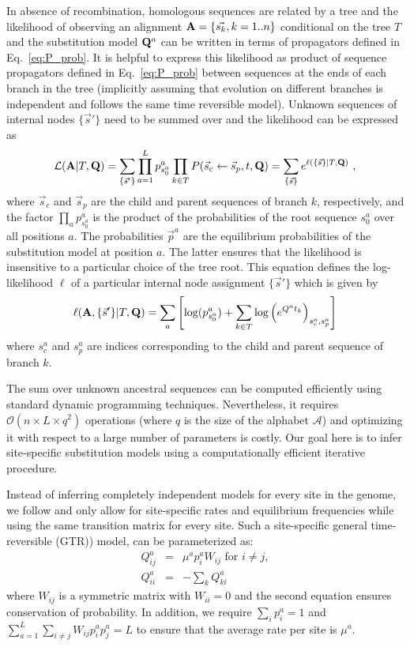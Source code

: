 \documentclass[aps,rmp,twocolumn,linenumbers]{revtex4-1}
\newcommand{\mat}[1]{{\bf #1}}
\newcommand{\abet}{\mathcal{A}}
\newcommand{\eqp}{p}
\newcommand{\LH}{\mathcal{L}}
\newcommand{\lh}{\ell}
\begin{document}
In absence of recombination, homologous sequences are related by a tree and the likelihood of observing an alignment $\mat{A}=\{\vec{s_k}, k=1..n\}$ conditional on the tree $T$ and the substitution model $\mat{Q}^{a}$ can be written in terms of propagators defined in Eq.~\ref{eq:P_prob}.
It is helpful to express this likelihood as product of sequence propagators defined in Eq.~\ref{eq:P_prob} between sequences at the ends of each branch in the tree (implicitly assuming that evolution on different branches is independent and follows the same time reversible model).
Unknown sequences of internal nodes $\{\vec{s}'\}$ need to be summed over and the likelihood can be expressed as
\begin{equation}
	\LH(\mat{A}|T,\mat{Q}) = \sum_{\{\vec{s}'\}}\prod_{a=1}^L \eqp^{a}_{s^{a}_0} \prod_{k\in T}P(\vec{s}_c\leftarrow \vec{s}_p,t,\mat{Q}) = \sum_{\{\vec{s}\}} e^{\lh(\{\vec{s}\} |T, \mat{Q})}  \ ,
	\label{eq:LH}
\end{equation}
where $\vec{s}_c$ and $\vec{s}_p$ are the child and parent sequences of branch $k$, respectively, and the factor $\prod_a \eqp^{a}_{s^{a}_0}$ is the product of the probabilities of the root sequence $s^{a}_0$ over all positions $a$.
The probabilities $\vec{\eqp}^{a}$ are the equilibrium probabilities of the substitution model at position $a$.
The latter ensures that the likelihood is insensitive to a particular choice of the tree root.
This equation defines the log-likelihood $\lh$ of a particular internal node assignment $\{\vec{s}'\}$ which is given by
\begin{equation}
	\label{eq:logLH}
	\lh(\mat{A}, \{\vec{s}'\} |T, \mat{Q}) = \sum_a \left[\log(\eqp^a_{s^{a}_0}) + \sum_{k\in T} \log\left( e^{Q^at_k} \right)_{s^a_c, s^a_p}\right]
\end{equation}
where $s^a_c$ and $s^a_p$ are indices corresponding to the child and parent sequence of branch $k$.

The sum over unknown ancestral sequences can be computed efficiently using standard dynamic programming techniques.
Nevertheless, it requires $\mathcal{O}(n\times L \times q^2)$ operations (where $q$ is the size of the alphabet $\abet$) and optimizing it with respect to a large number of parameters is costly.
Our goal here is to infer site-specific substitution models using a computationally efficient iterative procedure.

Instead of inferring completely independent models for every site in the genome, we follow \citet{halpern_evolutionary_1998} and only allow for site-specific rates and equilibrium frequencies while using the same transition matrix for every site.
Such a site-specific general time-reversible (GTR)) model, can be parameterized as:
\begin{eqnarray}
Q^{a}_{ij} &=& \mu^{a}\eqp^{a}_{i} W_{ij} \textrm{ for } i\neq j,\nonumber \\
Q^{a}_{ii} &=& -\sum_k Q^{a}_{ki}
\label{eq:Qij_app}
\end{eqnarray}
where $W_{ij}$ is a symmetric matrix with $W_{ii}=0$ and the second equation ensures conservation of probability.
In addition, we require $\sum_i \eqp^{a}_i = 1$ and $\sum_{a=1}^L\sum_{i\neq j}W_{ij}p^{a}_ip^{a}_j=L$ to ensure that the average rate per site is $\mu^{a}$.
\end{document}
